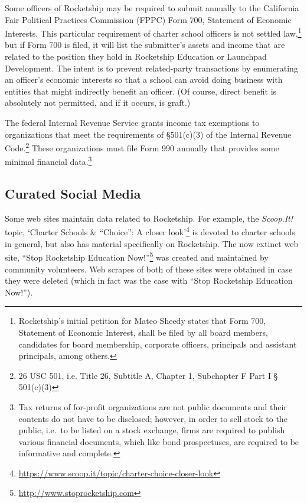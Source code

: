 Some officers of Rocketship may be required to submit annually to the California Fair Political Practices Commission (FPPC) Form 700, Statement of Economic Interests. This particular requirement of charter school officers is not settled law,\footnote{Rocketship's initial petition for Mateo Sheedy states that Form 700, Statement of Economic Interest, shall be filed by all board members, candidates for board membership, corporate officers, principals and assistant principals, among others.} but if Form 700 is filed, it will list the submitter's assets and income that are related to the position they hold in Rocketship Education or Launchpad Development. The intent is to prevent related-party transactions by enumerating an officer's economic interests so that a school can avoid doing business with entities that might indirectly benefit an officer. (Of course, direct benefit is absolutely not permitted, and if it occurs, is graft.)  

The federal Internal Revenue Service grants income tax exemptions to organizations that meet the requirements of §501(c)(3) of the  Internal Revenue Code.\footnote{26 USC 501, i.e. Title 26, Subtitle A, Chapter 1, Subchapter F Part I § 501(c)(3)} These organizations must file Form 990 annually that provides some minimal financial data.\footnote{Tax returns of for-profit organizations are not public documents and their contents do not have to be disclosed; however, in order to sell stock to the public, i.e.~to be listed on a stock exchange, firms are required to publish various financial documents, which like bond prospectuses, are required to be informative and complete.} %

\subsection{Curated Social Media}\label{sec:curated-social-media}\indent%

Some web sites maintain data related to Rocketship. For example, the \textit{Scoop.It!} topic, `Charter Schools \& ``Choice'': A closer look'\footnote{\url{https://www.scoop.it/topic/charter-choice-closer-look}} is devoted to charter schools in general, but also has material specifically on Rocketship. The now extinct web site, ``Stop Rocketship Education Now!''\footnote{\url{http://www.stoprocketship.com}} was created and maintained by community volunteers. Web scrapes of both of these sites were obtained in case they were deleted (which in fact was the case with ``Stop Rocketship Education Now!'').

